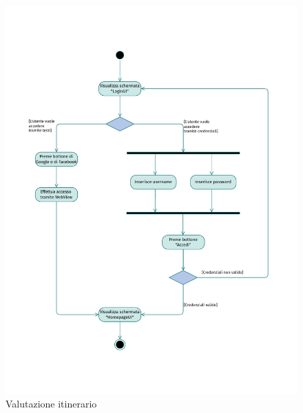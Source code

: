 \documentclass{natourDoc}
\begin{document}
	\newpage
	\begin{figure}[!htbp]
		\centering
		\includegraphics[width=\textwidth, page=11]{./diagrams/activity.pdf}
		\caption{Valutazione itinerario}
	\end{figure}
	\FloatBarrier
\end{document}
